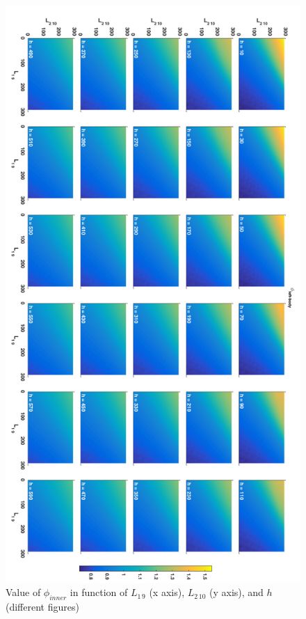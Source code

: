 \begin{figure}
	\includegraphics[width=1.0\linewidth]{figs/05/sim/phileft}
	\caption{Value of $\phi_{inner}$ in function of $L_{1\,9}$ (x axis), $L_{2\,10}$ (y axis), and $h$ (different figures)}
	\label{phileft}
\end{figure}

